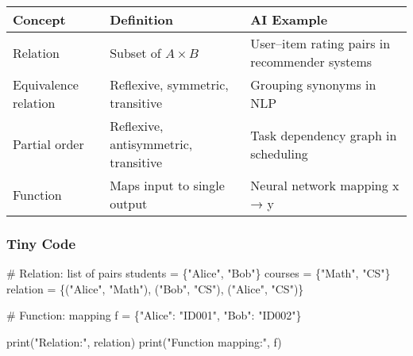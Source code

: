 \documentclass[
  letterpaper,
  DIV=11,
  numbers=noendperiod]{scrreprt}
\newenvironment{Shaded}{\begin{snugshade}}{\end{snugshade}}
\newcommand{\BuiltInTok}[1]{\textcolor[rgb]{0.00,0.23,0.31}{#1}}
\newcommand{\CommentTok}[1]{\textcolor[rgb]{0.37,0.37,0.37}{#1}}
\newcommand{\NormalTok}[1]{\textcolor[rgb]{0.00,0.23,0.31}{#1}}
\newcommand{\OperatorTok}[1]{\textcolor[rgb]{0.37,0.37,0.37}{#1}}
\newcommand{\StringTok}[1]{\textcolor[rgb]{0.13,0.47,0.30}{#1}}
\begin{document}
\begin{longtable}[]{@{}
  >{\raggedright\arraybackslash}p{}
  >{\raggedright\arraybackslash}p{}
  >{\raggedright\arraybackslash}p{}@{}}
\toprule\noalign{}
\begin{minipage}[b]{\linewidth}\raggedright
Concept
\end{minipage} & \begin{minipage}[b]{\linewidth}\raggedright
Definition
\end{minipage} & \begin{minipage}[b]{\linewidth}\raggedright
AI Example
\end{minipage} \\
\midrule\noalign{}
\endhead
\bottomrule\noalign{}
\endlastfoot
Relation & Subset of \(A \times B\) & User--item rating pairs in
recommender systems \\
Equivalence relation & Reflexive, symmetric, transitive & Grouping
synonyms in NLP \\
Partial order & Reflexive, antisymmetric, transitive & Task dependency
graph in scheduling \\
Function & Maps input to single output & Neural network mapping x → y \\
\end{longtable}

\subsubsection{Tiny Code}\label{tiny-code-170}

\begin{Shaded}
\begin{Highlighting}[]
\CommentTok{\# Relation: list of pairs}
\NormalTok{students }\OperatorTok{=}\NormalTok{ \{}\StringTok{"Alice"}\NormalTok{, }\StringTok{"Bob"}\NormalTok{\}}
\NormalTok{courses }\OperatorTok{=}\NormalTok{ \{}\StringTok{"Math"}\NormalTok{, }\StringTok{"CS"}\NormalTok{\}}
\NormalTok{relation }\OperatorTok{=}\NormalTok{ \{(}\StringTok{"Alice"}\NormalTok{, }\StringTok{"Math"}\NormalTok{), (}\StringTok{"Bob"}\NormalTok{, }\StringTok{"CS"}\NormalTok{), (}\StringTok{"Alice"}\NormalTok{, }\StringTok{"CS"}\NormalTok{)\}}

\CommentTok{\# Function: mapping}
\NormalTok{f }\OperatorTok{=}\NormalTok{ \{}\StringTok{"Alice"}\NormalTok{: }\StringTok{"ID001"}\NormalTok{, }\StringTok{"Bob"}\NormalTok{: }\StringTok{"ID002"}\NormalTok{\}}

\BuiltInTok{print}\NormalTok{(}\StringTok{"Relation:"}\NormalTok{, relation)}
\BuiltInTok{print}\NormalTok{(}\StringTok{"Function mapping:"}\NormalTok{, f)}
\end{Highlighting}
\end{Shaded}
\end{document}
